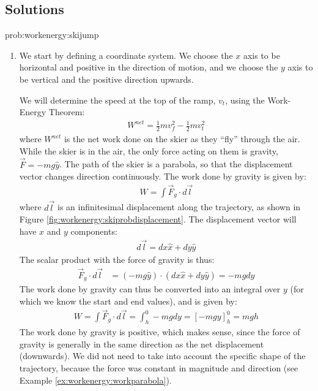 \subsection{Solutions}
\begin{solution}{prob:workenergy:skijump}\label{soln:workenergy:skijump}
\begin{enumerate}[label=\alph*)]
\item We start by defining a coordinate system. We choose the $x$ axis to be horizontal and positive in the direction of motion, and we choose the $y$ axis to be vertical and the positive direction upwards.

We will determine the speed at the top of the ramp, $v_t$, using the Work-Energy Theorem:
\begin{align*}
W^{net}=\frac{1}{2}mv_f^2-\frac{1}{2}mv_t^2
\end{align*}
where $W^{net}$ is the net work done on the skier as they ``fly'' through the air. While the skier is in the air, the only force acting on them is gravity, $\vec F=-mg\hat y$. The path of the skier is a parabola, so that the displacement vector changes direction continuously. The work done by gravity is given by:
\begin{align*}
W = \int \vec F_g \cdot d\vec l
\end{align*}
where $d\vec l$ is an infinitesimal displacement along the trajectory, as shown in Figure \ref{fig:workenergy:skiprobdisplacement}. 
The displacement vector will have $x$ and $y$ components:
\begin{align*}
d\vec l = dx \hat x + dy \hat y
\end{align*}
The scalar product with the force of gravity is thus:
\begin{align*}
\vec F_g \cdot d\vec l &= (-mg\hat y) \cdot (dx \hat x + dy \hat y)= -mgdy
\end{align*}
The work done by gravity can thus be converted into an integral over $y$ (for which we know the start and end values), and is given by:
\begin{align*}
W = \int \vec F_g \cdot d\vec l = \int_h^0 -mgdy = [-mgy]_h^0 = mgh
\end{align*}
The work done by gravity is positive, which makes sense, since the force of gravity is generally in the same direction as the net displacement (downwards). We did not need to take into account the specific shape of the trajectory, because the force was constant in magnitude and direction (see Example \ref{ex:workenergy:workparabola}).


\end{enumerate}
\end{solution}
